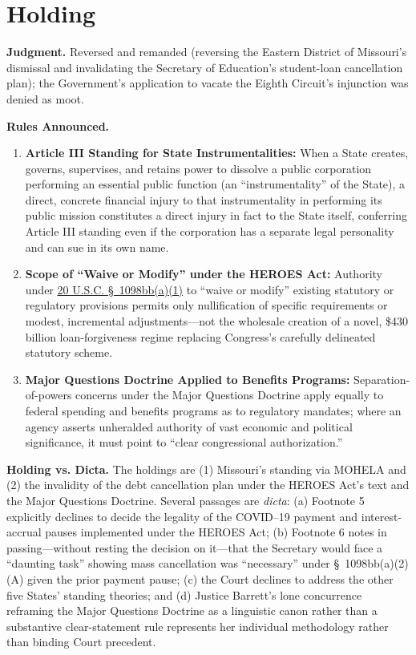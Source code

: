 \documentclass[12pt]{article}
\begin{document}
\section{Holding}

\textbf{Judgment.} Reversed and remanded (reversing the Eastern District of Missouri's dismissal and invalidating the Secretary of Education's student-loan cancellation plan); the Government's application to vacate the Eighth Circuit's injunction was denied as moot.

\textbf{Rules Announced.}
\begin{enumerate}
  \item \textbf{Article III Standing for State Instrumentalities:} When a State creates, governs, supervises, and retains power to dissolve a public corporation performing an essential public function (an ``instrumentality'' of the State), a direct, concrete financial injury to that instrumentality in performing its public mission constitutes a direct injury in fact to the State itself, conferring Article III standing even if the corporation has a separate legal personality and can sue in its own name.
  \item \textbf{Scope of ``Waive or Modify'' under the HEROES Act:} Authority under \href{https://www.law.cornell.edu/uscode/text/20/1098bb}{20 U.S.C. \S~1098bb(a)(1)} to ``waive or modify'' existing statutory or regulatory provisions permits only nullification of specific requirements or modest, incremental adjustments---not the wholesale creation of a novel, \$430 billion loan-forgiveness regime replacing Congress's carefully delineated statutory scheme.
  \item \textbf{Major Questions Doctrine Applied to Benefits Programs:} Separation-of-powers concerns under the Major Questions Doctrine apply equally to federal spending and benefits programs as to regulatory mandates; where an agency asserts unheralded authority of vast economic and political significance, it must point to ``clear congressional authorization.''
\end{enumerate}

\textbf{Holding vs. Dicta.} The holdings are (1) Missouri's standing via MOHELA and (2) the invalidity of the debt cancellation plan under the HEROES Act's text and the Major Questions Doctrine. Several passages are \textit{dicta}: (a) Footnote 5 explicitly declines to decide the legality of the COVID--19 payment and interest-accrual pauses implemented under the HEROES Act; (b) Footnote 6 notes in passing---without resting the decision on it---that the Secretary would face a ``daunting task'' showing mass cancellation was ``necessary'' under \S~1098bb(a)(2)(A) given the prior payment pause; (c) the Court declines to address the other five States' standing theories; and (d) Justice Barrett's lone concurrence reframing the Major Questions Doctrine as a linguistic canon rather than a substantive clear-statement rule represents her individual methodology rather than binding Court precedent.
\end{document}
